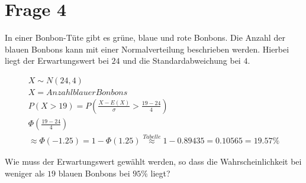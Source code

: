 \section{Frage 4}

In einer Bonbon-Tüte gibt es grüne, blaue und rote Bonbons. Die Anzahl der blauen Bonbons kann mit einer Normalverteilung beschrieben werden. Hierbei liegt der Erwartungswert bei $24$ und die Standardabweichung bei $4$.

\begin{align*}
    X \sim N(24, 4) \\
    X = Anzahl blauer Bonbons \\
    P(X > 19) = P\left(\frac{X - E(X)}{\sigma} > \frac{19 - 24}{4}\right) \\
    \Phi(\frac{19 - 24}{4}) \\
    \approx \Phi(-1.25) = 1 - \Phi(1.25) \overset{Tabelle}{\approx} 1 - 0.89435 = 0.10565 = 19.57\%
\end{align*}

Wie muss der Erwartungswert gewählt werden, so dass die Wahrscheinlichkeit bei weniger als $19$ blauen Bonbons bei $95\%$ liegt?

\begin{align*}
    
\end{align*}
